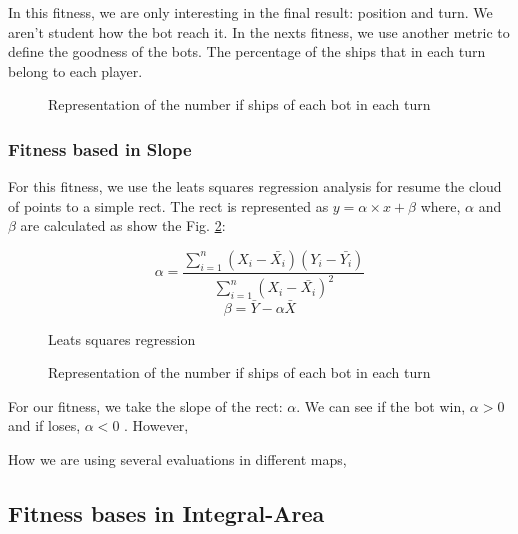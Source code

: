 \documentclass{llncs}
\begin{document}
In this fitness, we are only interesting in the final result: position and turn. We aren't student how the bot reach it. In the nexts fitness, we use another metric to define the goodness of the bots. The percentage of the ships that in each turn belong to each player.

\begin{figure}
\begin{center}
\end{center}
\caption{Representation of the number if ships of each bot in each turn} 
\label{figura:nubecita}
\end{figure}

\subsubsection{Fitness based in Slope}

For this fitness, we use the leats squares regression analysis for resume the cloud of points to a simple rect. The rect is represented as {$y = \alpha \times x + \beta $} where, {$\alpha$} and {$\beta$} are calculated as show the Fig. \ref{equation:LeatsSqueares}:

\begin{figure}
    \begin{equation}
        \alpha = \frac{\sum_{i=1}^{n}(X_{i} - \bar{X_{i}})(Y_{i} - \bar{Y_{i}})}{\sum_{i=1}^{n}(X_{i} - \bar{X_{i}})^{2}}
    \end{equation}
    \begin{equation}
        \beta = \bar{Y}-\alpha\bar{X}
    \end{equation}
    \caption{Leats squares regression}
    \label{equation:LeatsSqueares}
\end{figure}

\begin{figure}
\begin{center}
\end{center}
\caption{Representation of the number if ships of each bot in each turn} 
\label{figura:nubecita}
\end{figure}

For our fitness, we take the slope of the rect: {$\alpha$}. We can see if the bot win, {$\alpha>0$} and if loses, {$\alpha<0$} . However,  

How we are using several evaluations in different maps, 


\subsection{Fitness bases in Integral-Area}
\end{document}
